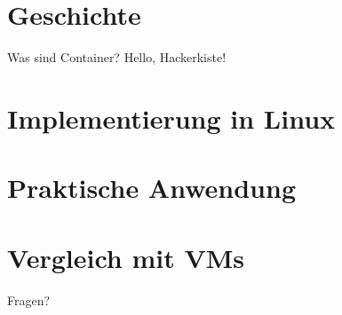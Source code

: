 \documentclass{beamer}
\begin{document}
  \section{Geschichte}
  \begin{frame}{Was sind Container?}
    Hello, Hackerkiste!
  \end{frame}

  \section{Implementierung in Linux}
  \section{Praktische Anwendung}
  \section{Vergleich mit VMs}

  \begin{frame}[standout]
    Fragen?
  \end{frame}
\end{document}
